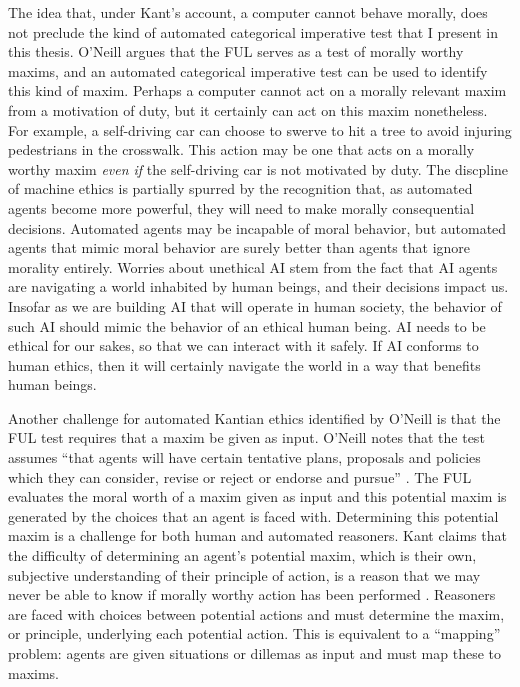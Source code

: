 \begin{isabellebody}
\begin{isamarkuptext}
The idea that, under Kant's account, a computer cannot behave morally, does not preclude the kind 
of automated categorical imperative test that I present in this thesis. O'Neill argues that the FUL
serves as a test of morally worthy maxims, and an automated categorical imperative test can be used 
to identify this kind of maxim. Perhaps a computer cannot act on a morally relevant maxim from a motivation of duty, 
but it certainly can act on this maxim nonetheless. For example, a self-driving car can choose to swerve to hit a tree
to avoid injuring pedestrians in the crosswalk. This action may be one that acts on a morally worthy maxim
\emph{even if} the self-driving car is not motivated by duty. The discpline of machine ethics is partially
spurred by the recognition that, as automated agents become more powerful, they will need to make
morally consequential decisions. Automated agents may be incapable of moral behavior, but automated agents that mimic
moral behavior are surely better than agents that ignore morality entirely. Worries about unethical AI
stem from the fact that AI agents are navigating a world inhabited by human beings, and their decisions
impact us. Insofar as we are building AI that will operate in human society, the behavior of such AI 
should mimic the behavior of an ethical human being. AI needs to be ethical for our sakes, so that we 
can interact with it safely. If AI conforms to human ethics, then it will certainly navigate the world
in a way that benefits human beings.

Another challenge for automated Kantian ethics identified by O'Neill is that the FUL test requires that
a maxim be given as input. O'Neill notes that the test assumes ``that agents will have certain tentative 
plans, proposals and policies which they can consider, revise or reject or endorse and pursue'' \citep[343]{oneilluniversallaws}.
The FUL evaluates the moral worth of a maxim given as input and this potential maxim is generated by 
the choices that an agent is faced with. Determining this potential maxim is a challenge for both human
and automated reasoners. Kant claims that the difficulty of determining an agent's potential maxim, which is their
own, subjective understanding of their principle of action, is a reason that we may never be able 
to know if morally worthy action has been performed \cite[345]{oneilluniversallaws}. Reasoners are faced with
choices between potential actions and must determine the maxim, or principle, underlying each potential action.
This is equivalent to a ``mapping'' problem: agents are given situations or dillemas as input and must map
these to maxims.


\end{isamarkuptext}
\end{isabellebody}
